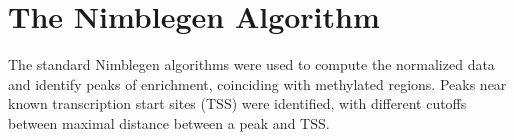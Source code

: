\documentclass[11pt]{article}
\begin{document}
%
%
%
%
%
%
%
%
%
%
%
%
%

%
%
%
%
%


\section*{The Nimblegen Algorithm}

The standard Nimblegen algorithms were used to compute the normalized data and identify peaks of enrichment, coinciding with methylated regions. Peaks near known transcription start sites (TSS) were identified, with different cutoffs between maximal distance between a peak and TSS.
\end{document}
